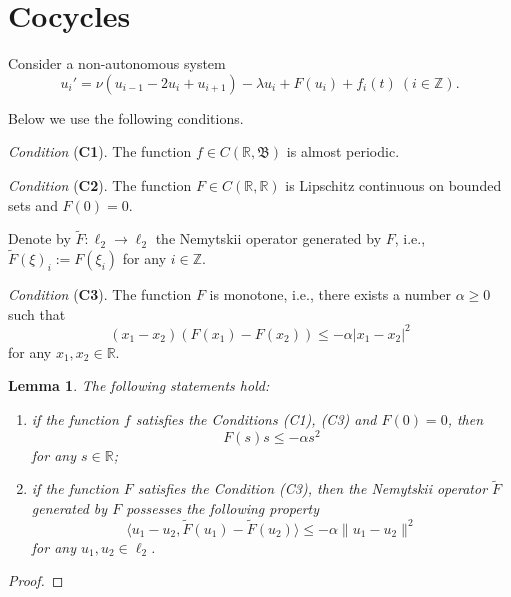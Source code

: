 \documentclass{amsart}%
\newtheorem{lemma}{Lemma}[section]
\begin{document}
\section{Cocycles}\label{Sec2}

Consider a non-autonomous system
\begin{equation}\label{eq2.1}
u_{i}'=\nu (u_{i-1}-2u_i+u_{i+1})-\lambda u_{i}+F(u_i)+f_{i}(t)\
(i\in \mathbb Z) .
\end{equation}

Below we use the following conditions.

\emph{Condition }(\textbf{C1}). \label{C1} The function $f\in
C(\mathbb R,\mathfrak B)$ is almost periodic.

\emph{Condition} (\textbf{C2}). \label{C2} The function $F\in
C(\mathbb R,\mathbb R)$ is Lipschitz continuous on bounded sets
and $F(0)=0$.

Denote by $ \widetilde{F}:\ell_{2}\to \ell_{2}$ the Nemytskii
operator generated by $F$, i.e.,
$\widetilde{F}(\xi)_{i}:=F(\xi_{i})$ for any $i\in \mathbb Z$.

\emph{Condition} (\textbf{C3}). \label{C3} The function $F$ is
monotone, i.e., there exists a number $\alpha \ge 0$ such that
\begin{equation}\label{eqAP2}
(x_1-x_2)(F(x_1)-F(x_2))\leq -\alpha
|x_1-x_2|^2
\end{equation}
for any $x_1,x_2 \in \mathbb R$.

\begin{lemma}\label{lAP1} The following statements hold:
\begin{enumerate}
\item if the function $f$ satisfies the Conditions (C1), (C3) and
$F(0)=0$, then
\begin{equation}\label{eqAP3}
F(s)s\le -\alpha s^{2}
\end{equation}
for any $s\in \mathbb R$; \item if the function $F$ satisfies the
Condition (C3), then the Nemytskii operator $\widetilde{F}$
generated by $F$ possesses the following property
\begin{equation}\label{eqAP4}
\langle u_1-u_2,\widetilde{F}(u_1)-\widetilde{F}(u_2)\rangle \le
-\alpha \|u_1-u_2\|^{2}
\end{equation}
for any $u_1,u_2\in \ell_{2}$.
\end{enumerate}
\end{lemma}
\begin{proof}

\end{proof}
\end{document}

